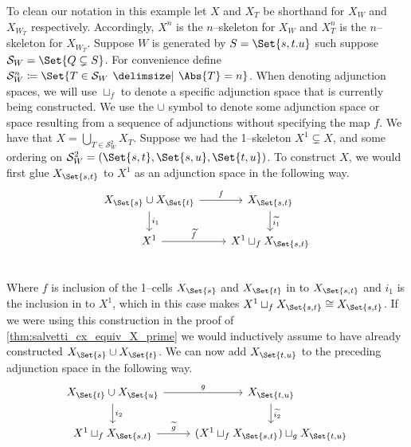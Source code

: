 \documentclass[class=article, crop=false]{standalone}
\begin{document}
\begin{example}
    \label{eg:inductive_construction}
    To clean our notation in this example let $X$ and $X_T$ be shorthand for $X_W$ and $X_{W_T}$ respectively. Accordingly, $X^n$ is the $n$--skeleton for $X_W$ and $X_T^n$ is the $n$--skeleton for $X_{W_T}$.
    Suppose $W$ is generated by $S = \Set{s,t.u}$ such suppose $\mathcal{S}_W  = \Set{Q \subsetneq S}$. For convenience define $\mathcal{S}_W^n \coloneq \Set{T \in \mathcal{S}_W \given \Abs{T} = n }$. When denoting adjunction spaces, we will use $\sqcup_f$ to denote a specific adjunction space that is currently being constructed. We use the $\cup$ symbol to denote some adjunction space or space resulting from a sequence of adjunctions without specifying the map $f$. We have that $X = \bigcup_{T \in \mathcal{S}_W^2} X_T$. Suppose we had the 1--skeleton $X^1 \subsetneq X$, and some ordering on $\mathcal{S}_W^2 = (\Set{s,t}, \Set{s,u}, \Set{t,u})$. To construct $X$, we would first glue $X_{\Set{s,t}}$ to $X^1$ as an adjunction space in the following way.
    \begin{equation}
        \begin{tikzcd}
                X_{{\Set{s}}} \cup X_{{\Set{t}}} \ar[r, "f" ] \ar[d, "i_1"]   &    X_{{\Set{s,t}}} \ar[d, "\widetilde{i_1}"]    \\
                X^1 \ar[r, "\widetilde{f}"]                                 &   X^1 \sqcup_f X_{{\Set{s,t}}}            \\
        \end{tikzcd}
        \label{eqn:inductive_gluing_step_1}
    \end{equation}
    Where $f$ is inclusion of the 1--cells $X_{{\Set{s}}}$ and $X_{{\Set{t}}}$ in to $X_{\Set{s,t}}$ and $i_1$ is the inclusion in to $X^1$, which in this case makes $X^1 \sqcup_f X_{{\Set{s,t}}} \cong X_{{\Set{s,t}}}$. If we were using this construction in the proof of \cref{thm:salvetti_cx_equiv_X_prime} we would inductively assume to have already constructed $ X_{{\Set{s}}} \cup X_{{\Set{t}}}$.
    We can now add $X_{\Set{t,u}}$ to the preceding adjunction space in the following way.
    \begin{equation}
        \begin{tikzcd}
                X_{{\Set{t}}} \cup X_{{\Set{u}}} \ar[r, "g" ] \ar[d, "i_2"]   &  X_{{\Set{t,u}}}   \ar[d, "\widetilde{i_2}"]    \\
                X^1 \sqcup_f X_{{\Set{s,t}}} \ar[r, "\widetilde{g}"]            &   (X^1 \sqcup_f X_{{\Set{s,t}}}) \sqcup_g X_{{\Set{t,u}}}            \\

\end{tikzcd}
\end{equation}
\end{example}
\end{document}
